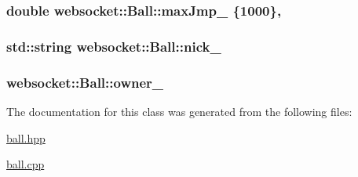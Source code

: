 \subsubsection[{\texorpdfstring{max\+Jmp\+\_\+}{maxJmp_}}]{\setlength{\rightskip}{0pt plus 5cm}double websocket\+::\+Ball\+::max\+Jmp\+\_\+ \{1000\}\hspace{0.3cm}{\ttfamily [static]}, {\ttfamily [private]}}\hypertarget{classwebsocket_1_1Ball_aea1b5a3677ef07c44e8eda0eb73a8e9f}{}\label{classwebsocket_1_1Ball_aea1b5a3677ef07c44e8eda0eb73a8e9f}
\subsubsection[{\texorpdfstring{nick\+\_\+}{nick_}}]{\setlength{\rightskip}{0pt plus 5cm}std\+::string websocket\+::\+Ball\+::nick\+\_\+\hspace{0.3cm}{\ttfamily [private]}}\hypertarget{classwebsocket_1_1Ball_ac9c16252cac70db6b19e8047aad3b837}{}\label{classwebsocket_1_1Ball_ac9c16252cac70db6b19e8047aad3b837}
\subsubsection[{\texorpdfstring{owner\+\_\+}{owner_}}]{ websocket\+::\+Ball\+::owner\+\_\+\hspace{0.3cm}{\ttfamily [private]}}\hypertarget{classwebsocket_1_1Ball_a19821c2fef55f296918cd67486d194a7}{}\label{classwebsocket_1_1Ball_a19821c2fef55f296918cd67486d194a7}


The documentation for this class was generated from the following files\+:\begin{DoxyCompactItemize}
\item 
\hyperlink{ball_8hpp}{ball.\+hpp}\item 
\hyperlink{ball_8cpp}{ball.\+cpp}\end{DoxyCompactItemize}
